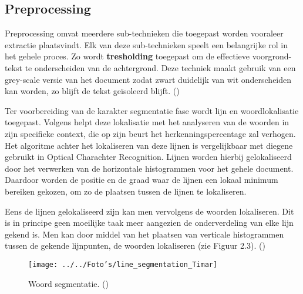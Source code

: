 \subsection{Preprocessing}

Preprocessing omvat meerdere sub-technieken die toegepast worden vooraleer extractie plaatsvindt. Elk van deze sub-technieken speelt een belangrijke rol in het gehele proces. Zo wordt \textbf{tresholding} toegepast om de effectieve voorgrond-tekst te onderscheiden van de achtergrond. Deze techniek maakt gebruik van een grey-scale versie van het document zodat zwart duidelijk van wit onderscheiden kan worden, zo blijft de tekst geïsoleerd blijft. (\cite{RejeanPlamondon2000}) 

Ter voorbereiding van de karakter segmentatie fase wordt lijn en woordlokalisatie toegepast. Volgens \cite{GergelyTimar2003} helpt deze lokalisatie met het analyseren van de woorden in zijn specifieke context, die op zijn beurt het herkenningspercentage zal verhogen. Het algoritme achter het lokaliseren van deze lijnen is vergelijkbaar met diegene gebruikt in Optical Charachter Recognition. Lijnen worden hierbij gelokaliseerd door het verwerken van de horizontale histogrammen voor het gehele document. Daardoor worden de positie en de graad waar de lijnen een lokaal minimum bereiken gekozen, om zo de plaatsen tussen de lijnen te lokaliseren.  

Eens de lijnen gelokaliseerd zijn kan men vervolgens de woorden lokaliseren. Dit is in principe geen moeilijke taak meer aangezien de onderverdeling van elke lijn gekend is. Men kan door middel van het plaatsen van verticale histogrammen tussen de gekende lijnpunten, de woorden lokaliseren (zie Figuur 2.3). (\cite{GergelyTimar2003}) 

\begin{figure}
\newpage

	\texttt{[image: ../../Foto's/line\_segmentation\_Timar]}
	\captionsetup{justification=centering,margin=2cm}
	\caption{Woord segmentatie. (\cite{GergelyTimar2003})}
	\centering
\end{figure}




